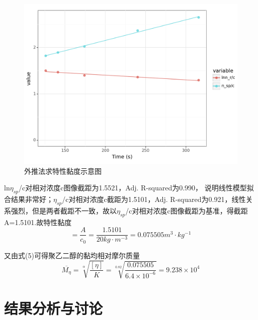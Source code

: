 \documentclass[12pt,hyperref,a4paper,UTF8]{ctexart}
\begin{document}
\begin{figure}[H]
    \centering
    \includegraphics[width=0.7\linewidth]{fig3.png}
    \caption{外推法求特性黏度示意图}
    \label{fig:enter-label}
\end{figure}


ln$\eta _{sp}$/c对相对浓度c图像截距为1.5521，Adj. R-squared为0.990， 说明线性模型拟合结果非常好；$\eta _{sp}$/c对相对浓度c截距为1.5101，Adj. R-squared为0.921，线性关系强烈，但是两者截距不一致，故以$\eta _{sp}$/c对相对浓度c图像截距为基准，得截距A=1.5101.故特性黏度\begin{equation}
    [\eta] = \frac{A}{c_0} = \frac{1.5101}{20kg\cdot m^{-3}} = 0.075505 m^3\cdot kg^{-1}
\end{equation}

又由式(5)可得聚乙二醇的黏均相对摩尔质量
\begin{equation}
     \overline{M_\eta} = \sqrt[\alpha]{\frac{[\eta]}{K}} = \sqrt[0.82]{\frac{0.075505}{6.4\times 10^{-6}}} = 9.238\times 10^4
\end{equation}

\section{结果分析与讨论}
\end{document}
